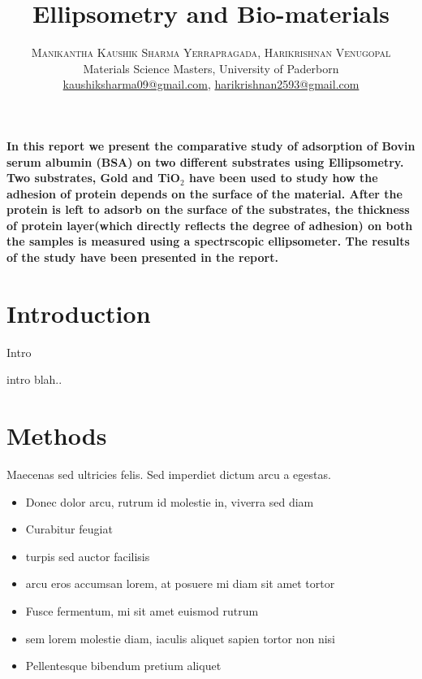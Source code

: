 \documentclass[twoside,twocolumn]{article}
\title{Ellipsometry and Bio-materials} %
\author{%
\textsc{Manikantha Kaushik Sharma Yerrapragada}, \textsc{Harikrishnan Venugopal} \\ %
\normalsize Materials Science Masters, University of Paderborn \\ %
\normalsize \href{mailto:kaushiksharma09@gmail.com}{kaushiksharma09@gmail.com},  \normalsize \href{mailto:harikrishnan2593@gmail.com}{harikrishnan2593@gmail.com}\\[1ex] %
}
\date{} %
\renewenvironment{abstract}
{\trivlist{}{\rightmargin\leftmargin}%
	\item[\noindent\itshape\textbf{ Abstract --}]\relax}
{\endlist}
\begin{document}
\maketitle


\begin{abstract}
\noindent \bfseries In this report we present the comparative study of adsorption of Bovin serum albumin (BSA) on two different substrates using Ellipsometry. Two substrates, Gold and TiO$_{2}$ have been used to study how the adhesion of protein depends on the surface of the material. After the protein is left to adsorb on the surface of the substrates, the thickness of protein layer(which directly reflects the degree of adhesion) on both the samples is measured using a spectrscopic ellipsometer. The results of the study have been presented in the report.   %
\end{abstract}
\section{Introduction}


Intro %

intro blah.. %


\section{Methods}

Maecenas sed ultricies felis. Sed imperdiet dictum arcu a egestas. 
\begin{itemize}
\item Donec dolor arcu, rutrum id molestie in, viverra sed diam
\item Curabitur feugiat
\item turpis sed auctor facilisis
\item arcu eros accumsan lorem, at posuere mi diam sit amet tortor
\item Fusce fermentum, mi sit amet euismod rutrum
\item sem lorem molestie diam, iaculis aliquet sapien tortor non nisi
\item Pellentesque bibendum pretium aliquet
\end{itemize}
\blindtext %
\end{document}
